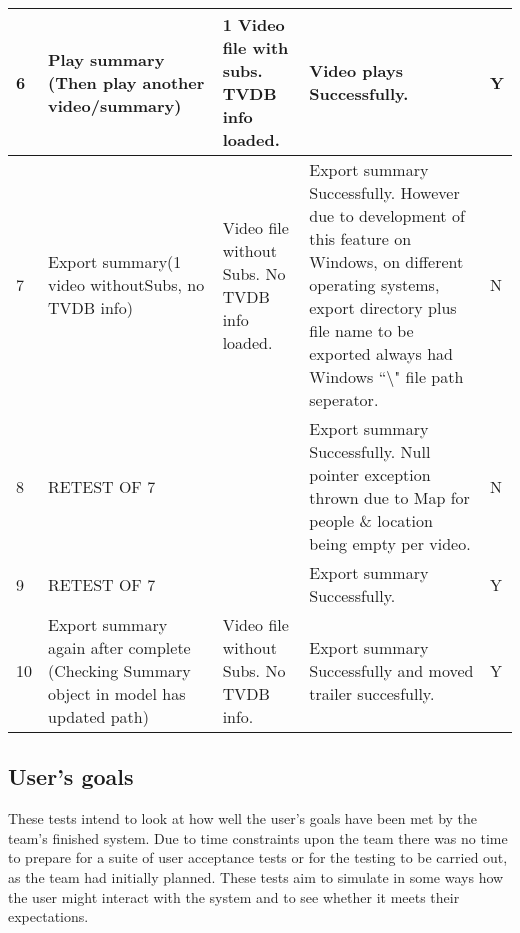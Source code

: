 \begin{center}
\begin{tabular}{| p{18pt} | p{92pt}| p{68pt}| p{152pt} | p{44pt} |}
\\\hline					
6	&Play summary \newline (Then play another video/summary)					&1 Video file with subs. \newline TVDB info \newline loaded. 	&Video plays Successfully.		&Y	
\\\hline								
7	&Export summary\newline (1 video without\newline Subs, no TVDB \newline info)	&Video file \newline without Subs. No TVDB \newline info loaded.	&Export summary Successfully. However due to development of this feature on Windows, on different operating systems, export directory plus file name to be exported always had Windows ``\textbackslash" file path seperator.			&N
\\\hline
8	&RETEST OF 7											&											&Export summary Successfully. Null pointer exception thrown due to Map for people \& location being empty per video.&N
\\\hline
9	&RETEST OF 7											&											&Export summary Successfully.	&Y
\\\hline			
10	&Export summary again after complete (Checking Summary object in model has updated path)	&Video file \newline without Subs. No TVDB \newline info.	&Export summary Successfully and moved trailer succesfully.	&Y	
\\\hline	
\end{tabular}
\end{center}

\subsection{User's goals}

These tests intend to look at how well the user's goals have been met by the
team's finished system. Due to time constraints upon the team there was no time to prepare for a suite of user acceptance tests or for the testing to be
carried out, as the team had initially planned. These tests aim to simulate in some ways
how the user might interact with the system and to see whether it meets their
expectations.

